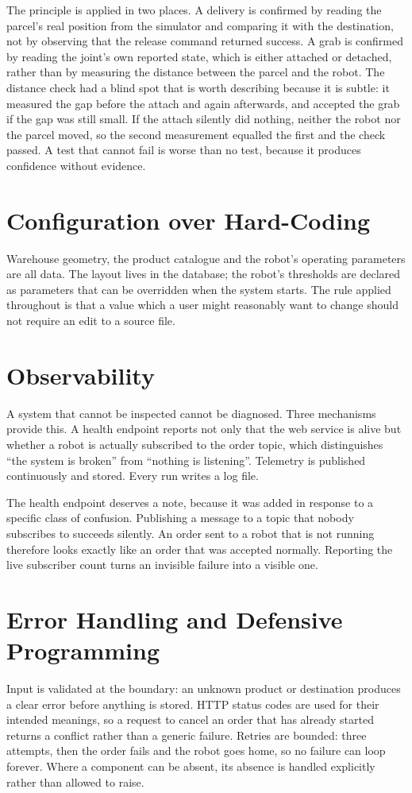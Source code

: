 \documentclass[12pt,a4paper]{report}
\begin{document}
The principle is applied in two places. A delivery is confirmed by reading the parcel's real
position from the simulator and comparing it with the destination, not by observing that the
release command returned success. A grab is confirmed by reading the joint's own reported state,
which is either attached or detached, rather than by measuring the distance between the parcel and
the robot. The distance check had a blind spot that is worth describing because it is subtle: it
measured the gap before the attach and again afterwards, and accepted the grab if the gap was still
small. If the attach silently did nothing, neither the robot nor the parcel moved, so the second
measurement equalled the first and the check passed. A test that cannot fail is worse than no test,
because it produces confidence without evidence.

\section{Configuration over Hard-Coding}
Warehouse geometry, the product catalogue and the robot's operating parameters are all data. The
layout lives in the database; the robot's thresholds are declared as parameters that can be
overridden when the system starts. The rule applied throughout is that a value which a user might
reasonably want to change should not require an edit to a source file.

\section{Observability}
A system that cannot be inspected cannot be diagnosed. Three mechanisms provide this. A health
endpoint reports not only that the web service is alive but whether a robot is actually subscribed
to the order topic, which distinguishes ``the system is broken'' from ``nothing is listening''.
Telemetry is published continuously and stored. Every run writes a log file.

The health endpoint deserves a note, because it was added in response to a specific class of
confusion. Publishing a message to a topic that nobody subscribes to succeeds silently. An order
sent to a robot that is not running therefore looks exactly like an order that was accepted
normally. Reporting the live subscriber count turns an invisible failure into a visible one.

\section{Error Handling and Defensive Programming}
Input is validated at the boundary: an unknown product or destination produces a clear error
before anything is stored. HTTP status codes are used for their intended meanings, so a request to
cancel an order that has already started returns a conflict rather than a generic failure. Retries
are bounded: three attempts, then the order fails and the robot goes home, so no failure can loop
forever. Where a component can be absent, its absence is handled explicitly rather than allowed to
raise.
\end{document}
